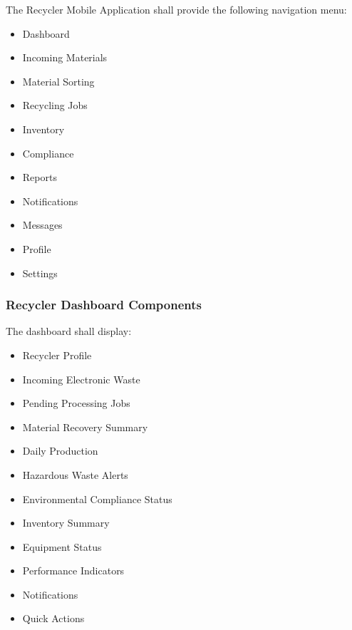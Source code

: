 The Recycler Mobile Application shall provide the following navigation
menu:

\begin{itemize}

\item Dashboard

\item Incoming Materials

\item Material Sorting

\item Recycling Jobs

\item Inventory

\item Compliance

\item Reports

\item Notifications

\item Messages

\item Profile

\item Settings

\end{itemize}


\subsubsection*{Recycler Dashboard Components}

The dashboard shall display:

\begin{itemize}

\item Recycler Profile

\item Incoming Electronic Waste

\item Pending Processing Jobs

\item Material Recovery Summary

\item Daily Production

\item Hazardous Waste Alerts

\item Environmental Compliance Status

\item Inventory Summary

\item Equipment Status

\item Performance Indicators

\item Notifications

\item Quick Actions

\end{itemize}

